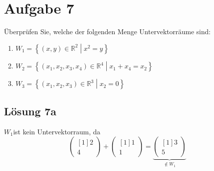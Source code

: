 \documentclass[main.tex]{subfiles}
\begin{document}
\section{Aufgabe 7}
Überprüfen Sie, welche der folgenden Menge Untervektorräume sind:

\begin{enumerate}
    \item $W_{1} =\left\{( x,y) \in \mathbb{R}^{2}\middle| x^{2} =y\right\}$
    \item $W_{2} =\left\{( x_{1} ,x_{2} ,x_{3} ,x_{4}) \in \mathbb{R}^{4}\middle| x_{1} +x_{4} =x_{2}\right\}$
    \item $W_{3} =\left\{( x_{1} ,x_{2} ,x_{3}) \in \mathbb{R}^{3}\middle| x_{2} =0\right\}$
\end{enumerate}

\subsection{Lösung 7a}

$W_{1}$ist kein Untervektorraum, da 
\begin{equation*}
    \begin{pmatrix}[1]
    2\\
    4
    \end{pmatrix} +\begin{pmatrix}[1]
    1\\
    1
    \end{pmatrix} =\underbrace{\begin{pmatrix}[1]
    3\\
    5
    \end{pmatrix}}_{\notin W_{1}}
\end{equation*}
\end{document}
